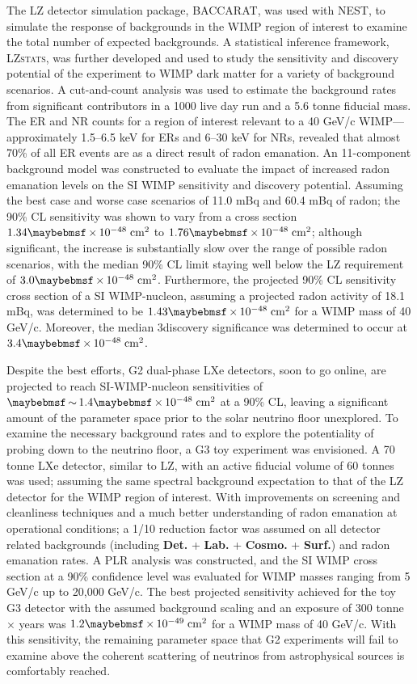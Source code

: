 The LZ detector simulation package, \textsc{BACCARAT}, was used with \textsc{NEST}, to simulate the response of backgrounds in the WIMP region of interest to examine the total number of expected backgrounds. A statistical inference framework, \textsc{LZstats}, was further developed and used to study the sensitivity and discovery potential of the experiment to WIMP dark matter for a variety of background scenarios. A cut-and-count analysis was used to estimate the background rates from significant contributors in a 1000 live day run and a 5.6 tonne fiducial mass. The ER and NR counts for a region of interest relevant to a 40 GeV/c\squared{} WIMP---approximately 1.5–6.5 keV for ERs and 6–30 keV for NRs, revealed that almost 70\% of all ER events are as a direct result of radon emanation. An 11-component background model was constructed to evaluate the impact of increased radon emanation levels on the SI WIMP sensitivity and discovery potential. Assuming the best case and worse case scenarios of 11.0 mBq and 60.4 mBq of radon; the 90\% CL sensitivity was shown to vary from a cross section $1.34\times10^{-48} \; \MathText{cm}^{2}$ to $1.76\times10^{-48} \; \MathText{cm}^{2}$; although significant, the increase is substantially slow over the range of possible radon scenarios, with the median 90\% CL limit staying well below the LZ requirement of $3.0\times10^{-48} \; \MathText{cm}^{2}$. Furthermore, the projected 90\% CL sensitivity cross section of a SI WIMP-nucleon, assuming a projected radon activity of 18.1 mBq, was determined to be $1.43\times10^{-48} \; \MathText{cm}^{2}$ for a WIMP mass of 40 GeV/c\squared{}. Moreover, the median 3\sigma  discovery significance was determined to occur at $3.4\times10^{-48} \; \MathText{cm}^{2}$. 

Despite the best efforts, G2 dual-phase LXe detectors, soon to go online, are projected to reach SI-WIMP-nucleon sensitivities of  $\sim1.4\times10^{-48} \; \MathText{cm}^{2}$ at a 90\% CL, leaving a significant amount of the parameter space prior to the solar neutrino floor unexplored. To examine the necessary background rates and to explore the potentiality of probing down to the neutrino floor, a G3 toy experiment was envisioned. A 70 tonne LXe detector, similar to LZ, with an active fiducial volume of 60 tonnes was used; assuming the same spectral background expectation to that of the LZ detector for the WIMP region of interest. With improvements on screening and cleanliness techniques and a much better understanding of radon emanation at operational conditions; a 1/10 reduction factor was assumed on all detector related backgrounds (including \textbf{Det.} + \textbf{Lab.} + \textbf{Cosmo.} + \textbf{Surf.}) and radon emanation rates. A PLR analysis was constructed, and the SI WIMP cross section at a 90\% confidence level was evaluated for WIMP masses ranging from 5 GeV/c\squared{} up to 20,000 GeV/c\squared{}. The best projected sensitivity achieved for the toy G3 detector with the assumed background scaling and an exposure of 300 tonne $\times$ years was $1.2\times10^{-49} \; \MathText{cm}^{2}$ for a WIMP mass of 40 GeV/c\squared{}. With this sensitivity, the remaining parameter space that G2 experiments will fail to examine above the coherent scattering of neutrinos from astrophysical sources is comfortably reached.

